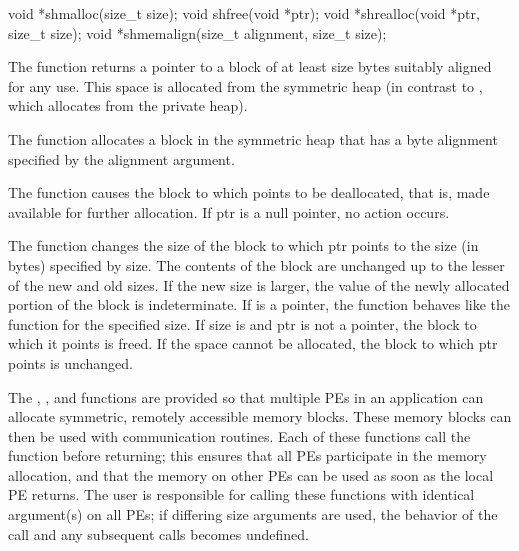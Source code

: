\cbstart %
\synC
void *shmalloc(size_t size);
void shfree(void *ptr);
void *shrealloc(void *ptr, size_t size);
void *shmemalign(size_t alignment, size_t size);%
\cbend

{
       The  function returns a pointer to a block of at least size
       bytes suitably aligned for any use.  This space is allocated from the
       symmetric heap (in contrast to , which allocates from the
       private heap).

       The   function allocates a block in the symmetric heap that
       has a byte alignment specified by the alignment argument.

       The  function causes the block to which  points to be
       deallocated, that is, made available for further allocation.  If ptr is
       a null pointer, no action occurs\cbstart . \cbend
              
       The   function changes the size of the block to which ptr
       points to the size (in bytes) specified by size.  The contents of the
       block are unchanged up to the lesser of the new and old sizes. If the
       new size is larger, the value of the newly allocated portion of the
       block is indeterminate.  If  is a  pointer, the  function behaves like the  function for the specified size.  If size  is  and ptr is not a  pointer, the block to which it points is freed\cbstart . \cbend If the space cannot be allocated, the block to which ptr points is unchanged.

       The , , and  functions are provided  so that multiple \ac{PE}s in an application can allocate symmetric, remotely
       accessible memory blocks.  These memory blocks can then be used with
       \openshmem communication routines.  Each of these functions call the
        function before returning; this ensures that all
       \ac{PE}s participate in the memory allocation, and that the memory on other
       \ac{PE}s can be used	as  soon as the local \ac{PE} returns.  The user is
       responsible for calling these functions with identical argument(s) on
       all \ac{PE}s; if differing size arguments are used, the behavior of the call and any subsequent \openshmem calls becomes undefined.
}

